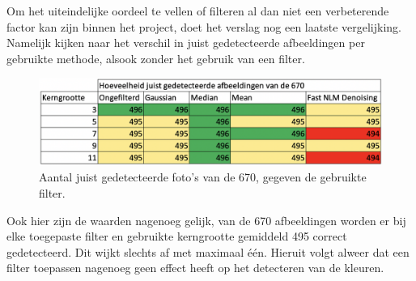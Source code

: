 Om het uiteindelijke oordeel te vellen of filteren al dan niet een verbeterende factor kan zijn binnen het project, doet het verslag nog een laatste vergelijking. Namelijk kijken naar het verschil in juist gedetecteerde afbeeldingen per gebruikte methode, alsook zonder het gebruik van een filter.

\begin{figure}[h!]
  \includegraphics[width=\linewidth]{img/filternofilter}
  \caption{Aantal juist gedetecteerde foto's van de 670, gegeven de gebruikte filter.}
  \label{fig:filternofilter}
\end{figure}

Ook hier zijn de waarden nagenoeg gelijk, van de 670 afbeeldingen worden er bij elke toegepaste filter en gebruikte kerngrootte gemiddeld 495 correct gedetecteerd. Dit wijkt slechts af met maximaal één. Hieruit volgt alweer dat een filter toepassen nagenoeg geen effect heeft op het detecteren van de kleuren.